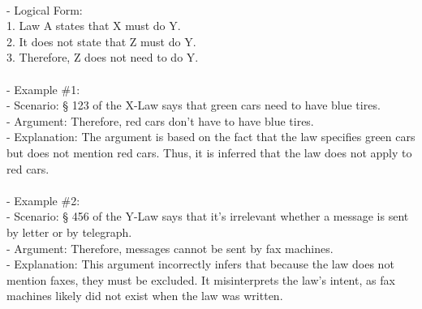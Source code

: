 \documentclass[a4paper,12pt,single,pdftex]{scrbook}
\begin{document}
    
      
    \\

    
      - Logical Form:
    \\

    
        1. Law A states that X must do Y.
    \\

    
        2. It does not state that Z must do Y.
    \\

    
        3. Therefore, Z does not need to do Y.
    \\

    
      
    \\

    
      - Example \#1:
    \\

    
        - Scenario: § 123 of the X-Law says that green cars need to have blue tires.
    \\

    
        - Argument: Therefore, red cars don't have to have blue tires.
    \\

    
        - Explanation: The argument is based on the fact that the law specifies green cars but does not mention red cars. Thus, it is inferred that the law does not apply to red cars.
    \\

    
      
    \\

    
      - Example \#2:
    \\

    
        - Scenario: § 456 of the Y-Law says that it's irrelevant whether a message is sent by letter or by telegraph.
    \\

    
        - Argument: Therefore, messages cannot be sent by fax machines.
    \\

    
        - Explanation: This argument incorrectly infers that because the law does not mention faxes, they must be excluded. It misinterprets the law's intent, as fax machines likely did not exist when the law was written.
    \\

    
      
    \\
\end{document}
